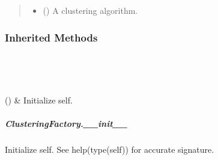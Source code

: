 \documentclass[letterpaper,10pt,english]{sphinxmanual}
\begin{document}
\begin{fulllineitems}
\begin{fulllineitems}
\begin{quote}
\begin{description}
\begin{itemize}
\item {} 
 () \textendash{} A clustering algorithm.

\end{itemize}

\end{description}\end{quote}

\end{fulllineitems}

\subsubsection*{Inherited Methods}


\begin{savenotes}\sphinxatlongtablestart\begin{longtable}[c]{}
\hline

\endfirsthead

%
{}\\
\hline

\endhead

\hline
{}\\
\endfoot

\endlastfoot

{\hyperref[\detokenize{api/generated/directional_clustering.clustering.ClusteringFactory.__init__:directional_clustering.clustering.ClusteringFactory.__init__}]{}}()
&
Initialize self.
\\
\hline
\end{longtable}\sphinxatlongtableend\end{savenotes}


\subparagraph{ClusteringFactory.\_\_init\_\_}
\label{\detokenize{api/generated/directional_clustering.clustering.ClusteringFactory.__init__:clusteringfactory-init}}\label{\detokenize{api/generated/directional_clustering.clustering.ClusteringFactory.__init__::doc}}

\begin{fulllineitems}
\label{\detokenize{api/generated/directional_clustering.clustering.ClusteringFactory.__init__:directional_clustering.clustering.ClusteringFactory.__init__}}
Initialize self.  See help(type(self)) for accurate signature.

\end{fulllineitems}


\end{fulllineitems}
\end{document}
